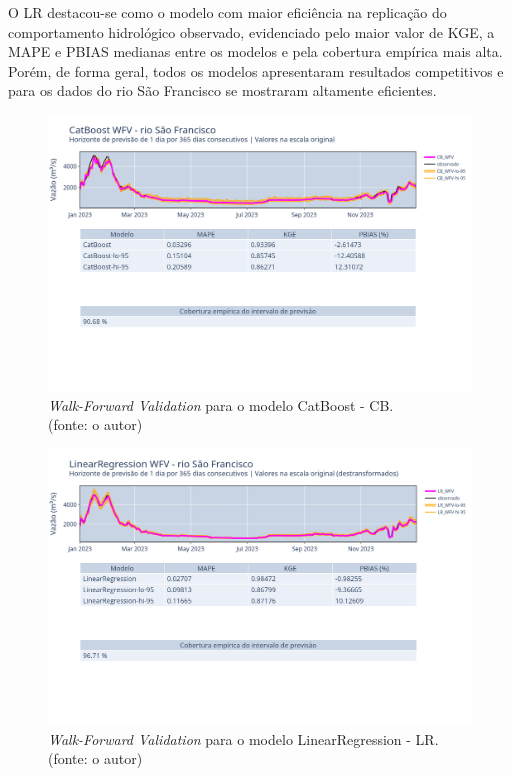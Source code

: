 O LR destacou-se como o modelo com maior eficiência na replicação do comportamento hidrológico observado, evidenciado pelo maior valor de KGE, a MAPE e PBIAS medianas entre os modelos e pela cobertura empírica mais alta. Porém, de forma geral, todos os modelos apresentaram resultados competitivos e para os dados do rio São Francisco se mostraram altamente eficientes.

\begin{figure}[!h]
	\centering
	\includegraphics[scale=0.33]{Figuras/rio_sao_francisco/wfv/CB/CB_WFV_ORIG.png}
	\caption{\textit{Walk-Forward Validation} para o modelo CatBoost - CB.\\(fonte: o autor)}
	\label{fig:francisco_CB_WFV_ORIG}
\end{figure}

\begin{figure}[!h]
	\centering
	\includegraphics[scale=0.33]{Figuras/rio_sao_francisco/wfv/LR/LR_WFV_LOG.png}
	\caption{\textit{Walk-Forward Validation} para o modelo LinearRegression - LR.\\(fonte: o autor)}
	\label{fig:francisco_LR_WFV_LOG}
\end{figure}

